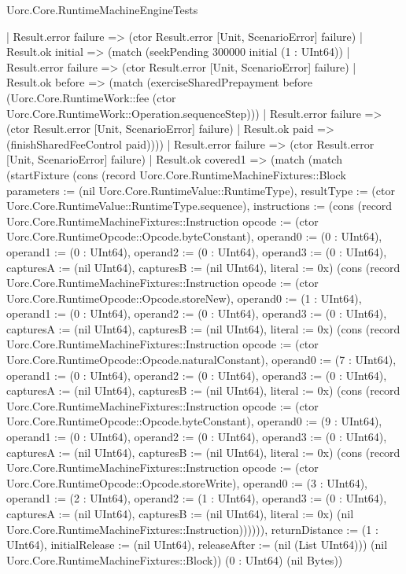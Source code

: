 \begin{lexlean}{Uorc.Core.RuntimeMachineEngineTests}
\begin{semanticmodule}
{        | Result.error failure => (ctor Result.error [Unit, ScenarioError] failure)
        | Result.ok initial => (match (seekPending 300000 initial (1 : UInt64))
          | Result.error failure => (ctor Result.error [Unit, ScenarioError] failure)
          | Result.ok before => (match (exerciseSharedPrepayment before (Uorc.Core.RuntimeWork::fee (ctor Uorc.Core.RuntimeWork::Operation.sequenceStep)))
            | Result.error failure => (ctor Result.error [Unit, ScenarioError] failure)
            | Result.ok paid => (finishSharedFeeControl paid))))
      | Result.error failure => (ctor Result.error [Unit, ScenarioError] failure)
      | Result.ok covered1 => (match (match (startFixture (cons (record Uorc.Core.RuntimeMachineFixtures::Block {parameters := (nil Uorc.Core.RuntimeValue::RuntimeType), resultType := (ctor Uorc.Core.RuntimeValue::RuntimeType.sequence), instructions := (cons (record Uorc.Core.RuntimeMachineFixtures::Instruction {opcode := (ctor Uorc.Core.RuntimeOpcode::Opcode.byteConstant), operand0 := (0 : UInt64), operand1 := (0 : UInt64), operand2 := (0 : UInt64), operand3 := (0 : UInt64), capturesA := (nil UInt64), capturesB := (nil UInt64), literal := 0x}) (cons (record Uorc.Core.RuntimeMachineFixtures::Instruction {opcode := (ctor Uorc.Core.RuntimeOpcode::Opcode.storeNew), operand0 := (1 : UInt64), operand1 := (0 : UInt64), operand2 := (0 : UInt64), operand3 := (0 : UInt64), capturesA := (nil UInt64), capturesB := (nil UInt64), literal := 0x}) (cons (record Uorc.Core.RuntimeMachineFixtures::Instruction {opcode := (ctor Uorc.Core.RuntimeOpcode::Opcode.naturalConstant), operand0 := (7 : UInt64), operand1 := (0 : UInt64), operand2 := (0 : UInt64), operand3 := (0 : UInt64), capturesA := (nil UInt64), capturesB := (nil UInt64), literal := 0x}) (cons (record Uorc.Core.RuntimeMachineFixtures::Instruction {opcode := (ctor Uorc.Core.RuntimeOpcode::Opcode.byteConstant), operand0 := (9 : UInt64), operand1 := (0 : UInt64), operand2 := (0 : UInt64), operand3 := (0 : UInt64), capturesA := (nil UInt64), capturesB := (nil UInt64), literal := 0x}) (cons (record Uorc.Core.RuntimeMachineFixtures::Instruction {opcode := (ctor Uorc.Core.RuntimeOpcode::Opcode.storeWrite), operand0 := (3 : UInt64), operand1 := (2 : UInt64), operand2 := (1 : UInt64), operand3 := (0 : UInt64), capturesA := (nil UInt64), capturesB := (nil UInt64), literal := 0x}) (nil Uorc.Core.RuntimeMachineFixtures::Instruction)))))), returnDistance := (1 : UInt64), initialRelease := (nil UInt64), releaseAfter := (nil (List UInt64))}) (nil Uorc.Core.RuntimeMachineFixtures::Block)) (0 : UInt64) (nil Bytes))
}
\end{semanticmodule}
\end{lexlean}

